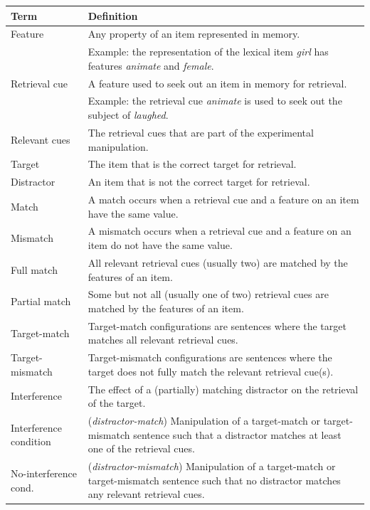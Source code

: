 \documentclass{cambridge7A}\usepackage[]{graphicx}\usepackage[]{color}
\begin{document}
\begin{subappendices}
\begin{table}[!htbp]
\begin{center}
{\footnotesize
\begin{tabular}{p{4cm}p{6cm}}
\hline
Term                & Definition \\
\hline
Feature             & Any property of an item represented in memory. \\
                    & Example: the representation of the lexical item \textit{girl} has features \textit{animate} and \textit{female}. \\
Retrieval cue       & A feature used to seek out an item in memory for retrieval. \\
                    & Example: the retrieval cue \textit{animate} is used to seek out the subject of \textit{laughed}. \\
Relevant cues				& The retrieval cues that are part of the experimental manipulation. \\
Target              & The item that is the correct target for retrieval. \\
Distractor          & An item that is not the correct target for retrieval. \\
Match               & A match occurs when a retrieval cue and a feature on an item have the same value. \\
Mismatch            & A mismatch occurs when a retrieval cue and a feature on an item do not have the same value. \\
Full match 			    & All relevant retrieval cues (usually two) are matched by the features of an item. \\
Partial match 			& Some but not all (usually one of two) retrieval cues are matched by the features of an item. \\
Target-match  		  & Target-match configurations are sentences where the target matches all relevant retrieval cues. \\
Target-mismatch 	  & Target-mismatch configurations are sentences where the target does not fully match the relevant retrieval cue(s). \\
Interference        & The effect of a (partially) matching distractor on the retrieval of the target. \\
Interference condition     & (\textit{distractor-match}) Manipulation of a target-match or target-mismatch sentence such that a distractor matches at least one of the retrieval cues. \\
No-interference cond.     & (\textit{distractor-mismatch}) Manipulation of a target-match or target-mismatch sentence such that no distractor matches any relevant retrieval cues. \\

\end{tabular}}
\end{center}
\end{table}
\end{subappendices}
\end{document}
